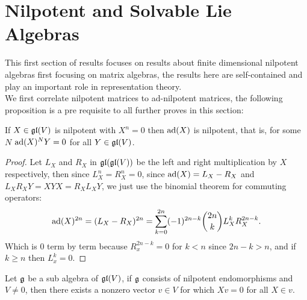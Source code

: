\section{Nilpotent and Solvable Lie Algebras}
This first section of results focuses on results about finite dimensional nilpotent algebras first focusing on matrix algebras, the results here are self-contained and play an important role in representation theory.\\
We first correlate nilpotent matrices to ad-nilpotent matrices, the following proposition is a pre requisite to all further proves in this section:
\begin{prop}
If $X \in \mathfrak{gl}(V)$ is nilpotent with $X^n=0$ then $\text{ad}(X)$ is nilpotent, that is, for some $N$ $\text{ad}(X)^NY = 0$ for all $Y \in \mathfrak{gl}(V)$.
\label{propadnilpotency}
\end{prop}
\begin{proof}
Let $L_X$ and $R_X$ in $\mathfrak{gl}(\mathfrak{gl}(V))$ be the left and right multiplication by $X$ respectively, then since $L_X^n = R_X^n = 0$, since $\text{ad}(X) = L_X - R_X$ and $L_XR_XY = XYX = R_XL_XY$, we just use the binomial theorem for commuting operators:
$$\text{ad}(X)^{2n} = (L_X-R_X)^{2n} = \sum_{k=0}^{2n} (-1)^{2n-k}{2n \choose k} L_X^{k} R_X^{2n-k}.$$
Which is $0$ term by term because $R_x^{2n-k}=0$ for $k<n$ since $2n-k>n$, and if $k\ge n$ then $L_x^k=0$.
\end{proof}
\begin{teo}
	 Let $\mathfrak{g}$ be a sub algebra of $\mathfrak{gl}(V)$, if $\mathfrak{g}$ consists of nilpotent endomorphisms and $V\not=0$, then there exists a nonzero vector $v \in V$ for which $Xv=0$ for all $X \in v$.
	 \label{Engel's Lemma}
\end{teo}
